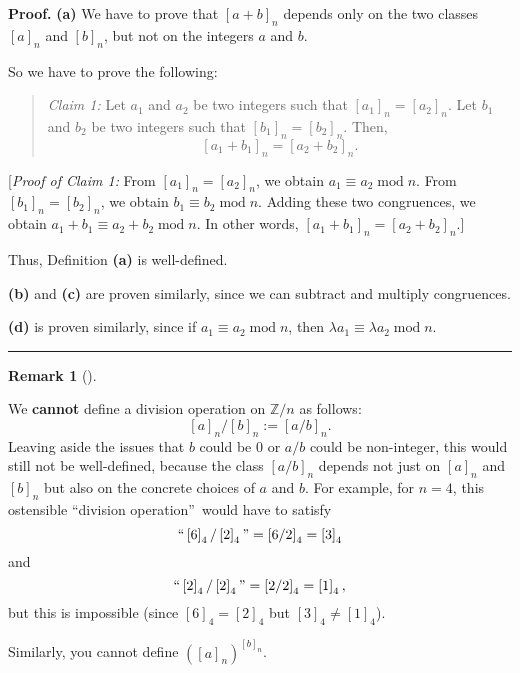 \documentclass[numbers=enddot,12pt,final,onecolumn,notitlepage]{scrartcl}%
\numberwithin{exer}{subsection}
\theoremstyle{definition}
\newtheorem{remk}[theo]{Remark}
\newenvironment{remark}[1][]
{\begin{remk}[#1]\begin{leftbar}}
{\end{leftbar}\end{remk}}
\newenvironment{statement}{\begin{quote}}{\end{quote}}
\newenvironment{proof}[1][Proof]{\noindent\textbf{#1.} }{\ \rule{0.5em}{0.5em}}
\begin{document}
\begin{proof}
\textbf{(a)} We have to prove that $\left[  a+b\right]  _{n}$ depends only on
the two classes $\left[  a\right]  _{n}$ and $\left[  b\right]  _{n}$, but not
on the integers $a$ and $b$.

So we have to prove the following:

\begin{statement}
\textit{Claim 1:} Let $a_{1}$ and $a_{2}$ be two integers such that $\left[
a_{1}\right]  _{n}=\left[  a_{2}\right]  _{n}$. Let $b_{1}$ and $b_{2}$ be two
integers such that $\left[  b_{1}\right]  _{n}=\left[  b_{2}\right]  _{n}$.
Then,%
\[
\left[  a_{1}+b_{1}\right]  _{n}=\left[  a_{2}+b_{2}\right]  _{n}.
\]

\end{statement}

[\textit{Proof of Claim 1:} From $\left[  a_{1}\right]  _{n}=\left[
a_{2}\right]  _{n}$, we obtain $a_{1}\equiv a_{2}\operatorname{mod}n$. From
$\left[  b_{1}\right]  _{n}=\left[  b_{2}\right]  _{n}$, we obtain
$b_{1}\equiv b_{2}\operatorname{mod}n$. Adding these two congruences, we
obtain $a_{1}+b_{1}\equiv a_{2}+b_{2}\operatorname{mod}n$. In other words,
$\left[  a_{1}+b_{1}\right]  _{n}=\left[  a_{2}+b_{2}\right]  _{n}$.]

Thus, Definition \textbf{(a)} is well-defined.

\textbf{(b)} and \textbf{(c)} are proven similarly, since we can subtract and
multiply congruences.

\textbf{(d)} is proven similarly, since if $a_{1}\equiv a_{2}%
\operatorname{mod}n$, then $\lambda a_{1}\equiv\lambda a_{2}\operatorname{mod}%
n$.
\end{proof}

\begin{remark}
We \textbf{cannot} define a division operation on $\mathbb{Z}/n$ as follows:%
\[
\left[  a\right]  _{n}/\left[  b\right]  _{n}:=\left[  a/b\right]  _{n}.
\]
Leaving aside the issues that $b$ could be $0$ or $a/b$ could be non-integer,
this would still not be well-defined, because the class $\left[  a/b\right]
_{n}$ depends not just on $\left[  a\right]  _{n}$ and $\left[  b\right]
_{n}$ but also on the concrete choices of $a$ and $b$. For example, for $n=4$,
this ostensible \textquotedblleft division operation\textquotedblright\ would
have to satisfy
\[
\text{\textquotedblleft}\left[  6\right]  _{4}/\left[  2\right]
_{4}\text{\textquotedblright}=\left[  6/2\right]  _{4}=\left[  3\right]  _{4}%
\]
and%
\[
\text{\textquotedblleft}\left[  2\right]  _{4}/\left[  2\right]
_{4}\text{\textquotedblright}=\left[  2/2\right]  _{4}=\left[  1\right]
_{4},
\]
but this is impossible (since $\left[  6\right]  _{4}=\left[  2\right]  _{4}$
but $\left[  3\right]  _{4}\neq\left[  1\right]  _{4}$).

Similarly, you cannot define $\left(  \left[  a\right]  _{n}\right)  ^{\left[
b\right]  _{n}}$.
\end{remark}
\end{document}

